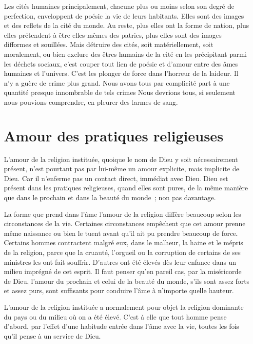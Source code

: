 \documentclass[french,twoside]{book} %
\begin{document}
Les cités humaines principalement, chacune plus ou moins selon son degré de perfection, enveloppent de poésie la vie de leurs habitants. Elles sont des images et des reflets de la cité du monde. Au reste, plus elles ont la forme de nation, plus elles prétendent à être elles-mêmes des patries, plus elles sont des images difformes et souillées. Mais détruire des cités, soit matériellement, soit moralement, ou bien exclure des êtres humains de la cité en les précipitant parmi les déchets sociaux, c'est couper tout lien de poésie et d'amour entre des âmes humaines et l'univers. C'est les plonger de force dans l'horreur de la laideur. Il n'y a guère de crime plus grand. Nous avons tous par complicité part à une quantité presque innombrable de tels crimes Nous devrions tous, si seulement nous pouvions comprendre, en pleurer des larmes de sang.
\section[{Amour des pratiques religieuses}]{Amour des pratiques religieuses}
\noindent L'amour de la religion instituée, quoique le nom de Dieu y soit nécessairement présent, n'est pourtant pas par lui-même un amour explicite, mais implicite de Dieu. Car il n'enferme pas un contact direct, immédiat avec Dieu. Dieu est présent dans les pratiques religieuses, quand elles sont pures, de la même manière que dans le prochain et dans la beauté du monde ; non pas davantage.\par
La forme que prend dans l'âme l'amour de la religion diffère beaucoup selon les circonstances de la vie. Certaines circonstances empêchent que cet amour prenne même naissance ou bien le tuent avant qu'il ait pu prendre beaucoup de force. Certains hommes contractent malgré eux, dans le malheur, la haine et le mépris de la religion, parce que la cruauté, l'orgueil ou la corruption de certains de ses ministres les ont fait souffrir. D'autres ont été élevés dès leur enfance dans un milieu imprégné de cet esprit. Il faut penser qu'en pareil cas, par la miséricorde de Dieu, l'amour du prochain et celui de la beauté du monde, s'ils sont assez forts et assez purs, sont suffisants pour conduire l'âme à n'importe quelle hauteur.\par
L'amour de la religion instituée a normalement pour objet la religion dominante du pays ou du milieu où on a été élevé. C'est à elle que tout homme pense d'abord, par l'effet d'une habitude entrée dans l'âme avec la vie, toutes les fois qu'il pense à un service de Dieu.\par
\end{document}
